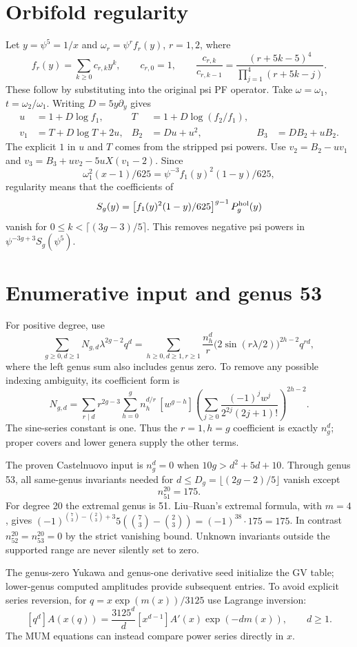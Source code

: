 \documentclass[11pt]{article}
\begin{document}
\section{Orbifold regularity}
Let $y=\psi^5=1/x$ and
$\omega_r=\psi^r f_r(y)$, $r=1,2$, where
\[
 f_r(y)=\sum_{k\ge0}c_{r,k}y^k,\qquad c_{r,0}=1,\qquad
 \frac{c_{r,k}}{c_{r,k-1}}=
 \frac{(r+5k-5)^4}{\prod_{j=1}^4(r+5k-j)}.
\]
These follow by substituting into the original psi PF operator.
Take $\omega=\omega_1$, $t=\omega_2/\omega_1$.
Writing $D=5y\partial_y$ gives
\begin{align*}
 u&=1+D\log f_1,&
 T&=1+D\log(f_2/f_1),\\
 v_1&=T+D\log T+2u,&
 B_2&=Du+u^2,&B_3&=DB_2+uB_2.
\end{align*}
The explicit $1$ in $u$ and $T$ comes from the stripped psi powers.
Use $v_2=B_2-uv_1$ and $v_3=B_3+uv_2-5uX(v_1-2)$.
Since
\[
 \omega_1^2(x-1)/625=\psi^{-3}f_1(y)^2(1-y)/625,
\]
regularity means that the coefficients of
\[
 S_g(y)=\left[f_1(y)^2(1-y)/625\right]^{g-1}P_g^{\rm hol}(y)
\]
vanish for $0\le k<\lceil(3g-3)/5\rceil$.
This removes negative psi powers in $\psi^{-3g+3}S_g(\psi^5)$.

\section{Enumerative input and genus 53}
For positive degree, use
\[
 \sum_{g\ge0,d\ge1}N_{g,d}\lambda^{2g-2}q^d=
 \sum_{h\ge0,d\ge1,r\ge1}\frac{n_h^d}{r}
 \bigl(2\sin(r\lambda/2)\bigr)^{2h-2}q^{rd},
\]
where the left genus sum also includes genus zero.
To remove any possible indexing ambiguity, its coefficient form is
\[
 N_{g,d}=\sum_{r\mid d}r^{2g-3}\sum_{h=0}^g
 n_h^{d/r}\,[w^{g-h}]
 \left(\sum_{j\ge0}\frac{(-1)^j w^j}{2^{2j}(2j+1)!}\right)^{2h-2}.
\]
The sine-series constant is one. Thus the $r=1,h=g$ coefficient is exactly
$n_g^d$; proper covers and lower genera supply the other terms.

The proven Castelnuovo input is $n_g^d=0$ when
$10g>d^2+5d+10$.
Through genus 53, all same-genus invariants needed for
$d\le D_g=\lfloor(2g-2)/5\rfloor$ vanish except
\[
 n_{51}^{20}=175.
\]
For degree 20 the extremal genus is 51. Liu--Ruan's extremal formula, with
$m=4$, gives $(-1)^{\binom73-\binom23+3}5(\binom73-\binom23)
=(-1)^{38}\cdot175=175$.
In contrast $n_{52}^{20}=n_{53}^{20}=0$ by the strict vanishing bound.
Unknown invariants outside the supported range are never silently set to zero.

The genus-zero Yukawa and genus-one derivative seed initialize the GV table;
lower-genus computed amplitudes provide subsequent entries. To avoid explicit
series reversion, for $q=x\exp(m(x))/3125$ use Lagrange inversion:
\[
 [q^d]A(x(q))=\frac{3125^d}{d}
 [x^{d-1}]A'(x)\exp(-dm(x)),\qquad d\ge1.
\]
The MUM equations can instead compare power series directly in $x$.
\end{document}
